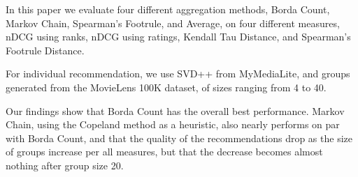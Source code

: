 In this paper we evaluate four different aggregation methods, Borda Count, Markov Chain, Spearman's Footrule, and Average, on four different measures, nDCG using ranks, nDCG using ratings, Kendall Tau Distance, and Spearman's Footrule Distance.

For individual recommendation, we use SVD++ from MyMediaLite, and groups generated from the MovieLens 100K dataset, of sizes ranging from 4 to 40.

Our findings show that Borda Count has the overall best performance. Markov Chain, using the Copeland method as a heuristic, also nearly performs on par with Borda Count, and that the quality of the recommendations drop as the size of groups increase per all measures, but that the decrease becomes almost nothing after group size 20.

%



